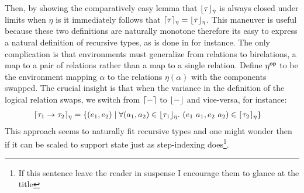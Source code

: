 Then, by showing the comparatively easy lemma that
$\lfloor \tau \rfloor_\eta$ is always closed under limits when $\eta$ is it
immediately follows that
$\lceil \tau \rceil_\eta = \lfloor \tau \rfloor_\eta$. This maneuver is
useful because these two definitions are naturally monotone therefore
its easy to express a natural definition of recursive types, as is
done in \citet{TODO-CRARY-HARPER} for instance. The only complication
is that environments must generalize from relations to birelations, a
map to a pair of relations rather than a map to a single
relation. Define $\eta^{\mathsf{op}}$ to be the environment mapping $\alpha$ to
the relations $\eta(\alpha)$ with the components swapped. The crucial
insight is that when the variance in the definition of the logical
relation swaps, we switch from $\lceil - \rceil$ to $\lfloor - \rfloor$ and
vice-versa, for instance:
\begin{align*}
  \lceil \tau_1 \to \tau_2 \rceil_\eta &=
  \{(e_1, e_2) \mid \forall (a_1, a_2) \in \lfloor \tau_1 \rfloor_\eta.
  \ (e_1\ a_1, e_2\ a_2) \in \lceil \tau_2 \rceil_\eta\}
\end{align*}
This approach seems to naturally fit recursive types and one might
wonder then if it can be scaled to support state just as step-indexing
does\footnote{If this sentence leave the reader in suspense I
  encourage them to glance at the title}.

